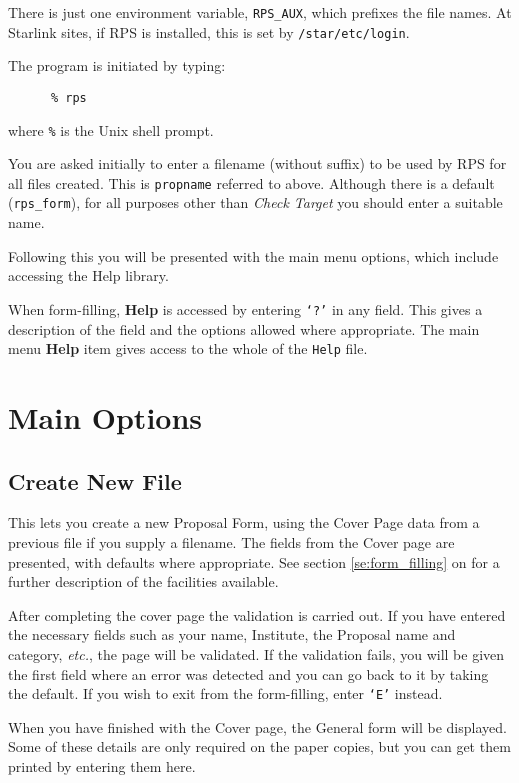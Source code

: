 There is just one environment variable, {\tt RPS\_AUX}, which prefixes
the file names.  At Starlink sites, if RPS is installed, this is set by
{\tt /star/etc/login}.

The program is initiated by typing:

\begin{verbatim}
      % rps
\end{verbatim}

where {\tt \%} is the Unix shell prompt.

You are asked initially to enter a filename (without suffix) to be used
by RPS for all files created. This is {\tt propname} referred to
above.  Although there is a default (\verb+rps_form+), for all
purposes other than {\em Check Target} you should enter a suitable
name.

Following this you will be presented with the main menu options, which
include accessing the Help library.

When form-filling, {\bf Help} is accessed by entering {\tt `?'} in any
field.  This gives a description of the field and the options allowed
where appropriate.  The main menu {\bf Help} item gives access to the whole
of the {\tt Help} file.

\section{\label{se:main_options}Main Options}

\subsection{Create New File}

This lets you create a new Proposal Form, using the Cover Page data
from a previous file if you supply a filename.  The fields from the
Cover page are presented, with defaults where appropriate.  See section
\ref{se:form_filling} on 
for a further description of the facilities available.

After completing the cover page the validation is carried out.  If you
have entered the necessary fields such as your name, Institute, the
Proposal name and category, {\em etc.},  the page will be validated.
If the validation fails, you will be given the first field where an
error was detected and you can go back to it by taking the default.  If
you wish to exit from the form-filling, enter {\tt `E'} instead.

When you have finished with the Cover page, the General form will be
displayed.  Some of these details are only required on the paper
copies, but you can get them printed by entering them here.

